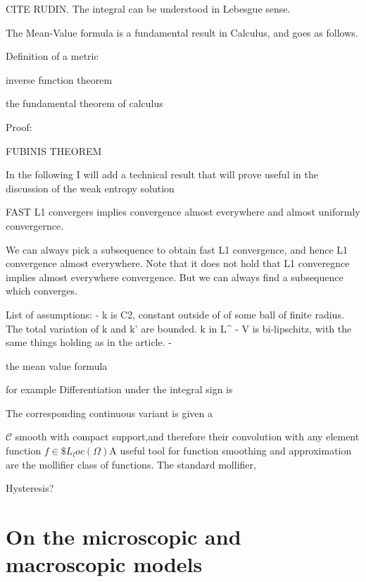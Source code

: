 \begin{definition}
 CITE RUDIN.  The integral can be understood in Lebesgue sense. 

The Mean-Value formula is a fundamental result in Calculus, and goes as follows. 

\begin{}


Definition of a metric

inverse function theorem

the fundamental theorem of calculus

Proof: 

FUBINIS THEOREM 

In the following I will add a technical result that will prove useful in the discussion of the weak entropy solution

FAST L1 convergers implies convergence almost everywhere and almost uniformly convergernce. 

\begin{}

We can always pick a subsequence to obtain fast L1 convergence, and hence L1 convergence almost everywhere. 
Note that it does not hold that L1 converegnce implies almost everywhere convergence. But we can always find a subsequence which converges. 

List of assumptions: 
- k is C2, constant outside of of some ball of finite radius. The total variation of k and k' are bounded. k in L^\infty 
- V is bi-lipschitz, with the same things holding as in the article. 
- 


the mean value formula 

for example
Differentiation under the integral sign is 

The corresponding continuous variant is given a





$\mathscr{C}$
smooth with compact support,and therefore their convolution with any element function $f \in \$L_loc(\Omega)$A useful tool for function smoothing and approximation are the mollifier class of functions. The standard mollifier, 


Hysteresis?

\section{On the microscopic and macroscopic models}




\end{}
\end{}
\end{definition}
